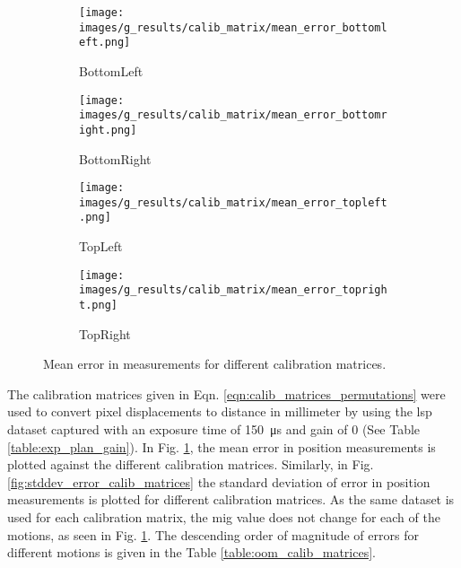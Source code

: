     \begin{figure}[ht]
        \centering
        \begin{subfigure}[b]{0.46\textwidth}
            \centering
            \texttt{[image: images/g\_results/calib\_matrix/mean\_error\_bottomleft.png]}
            \caption{\textsf{BottomLeft}}
        \end{subfigure}
        \hspace{1cm}
        \begin{subfigure}[b]{0.46\textwidth}
            \centering
            \texttt{[image: images/g\_results/calib\_matrix/mean\_error\_bottomright.png]}
            \caption{\textsf{BottomRight}}
        \end{subfigure}

        \vspace{5mm}
        
        \begin{subfigure}[b]{0.46\textwidth}
            \centering
            \texttt{[image: images/g\_results/calib\_matrix/mean\_error\_topleft.png]}
            \caption{\textsf{TopLeft}}
        \end{subfigure}
        \hspace{1cm}
        \begin{subfigure}[b]{0.46\textwidth}
            \centering
            \texttt{[image: images/g\_results/calib\_matrix/mean\_error\_topright.png]}
            \caption{\textsf{TopRight}}
        \end{subfigure}

        \caption{Mean error in measurements for different calibration matrices.}
        \label{fig:mean_error_calib_matrices}
    \end{figure}

    \noindent The calibration matrices given in Eqn. \ref{eqn:calib_matrices_permutations} were used to convert pixel displacements to distance in millimeter by using the \gls{lsp} dataset captured with an exposure time of \SI{150}{\micro\second} and gain of 0 (See Table \ref{table:exp_plan_gain}). In Fig. \ref{fig:mean_error_calib_matrices}, the mean error in position measurements is plotted against the different calibration matrices. Similarly, in Fig. \ref{fig:stddev_error_calib_matrices} the standard deviation of error in position measurements is plotted for different calibration matrices. As the same dataset is used for each calibration matrix, the \gls{mig} value does not change for each of the motions, as seen in Fig. \ref{fig:mean_error_calib_matrices}. The descending order of magnitude of errors for different motions is given in the Table \ref{table:oom_calib_matrices}.

